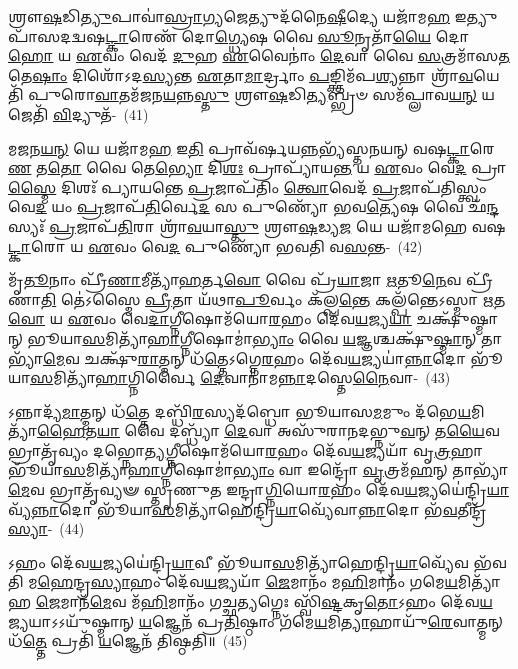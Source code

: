 𑌶𑍍𑌰𑍗\-\ul{𑌷}\-𑌡𑌿\-\ul{𑌤𑍍𑌯𑍁}\-𑌪𑌾𑌵𑌾॑\-\ul{𑌸𑍍𑌰𑌾}\-𑌗𑍍𑌯𑌜𑍇𑌤𑍍𑌯𑍁𑌦᳴𑌨𑍈\-\ul{𑌷𑍀}\-𑌦𑍍𑌯𑍇 𑌯𑌜𑌾᳴𑌮\-\ul{𑌹} 𑌇𑌤𑍍𑌯𑍁𑌪𑌾᳴𑌸\-𑌦𑌦𑍍𑌵𑌷\-\ul{𑌟𑍍𑌕𑌾}\-𑌰𑍇𑌣᳴ 𑌦𑍋\-\ul{𑌗𑍍𑌧𑍍𑌯𑍇}\-𑌷 𑌵𑍈 \ul{𑌸𑍂}\-𑌨𑍃𑌤𑌾᳴\-\ul{𑌯𑍈} 𑌦𑍋\-\ul{𑌹𑍋} 𑌯 \ul{𑌏}\-𑌵𑌂 𑌵𑍇𑌦᳴ \ul{𑌦𑍁}\-𑌹 \ul{𑌏}\-𑌵𑍈𑌨𑌾𑌂॑ \ul{𑌦𑍇}\-𑌵𑌾 𑌵𑍈 \ul{𑌸}\-𑌤𑍍𑌰𑌮𑌾᳴𑌸\-\ul{𑌤} 𑌤𑍇\-\ul{𑌷𑌾𑌂} 𑌦𑌿𑌶𑍋᳴\-𑌽𑌦\-\ul{𑌸𑍍𑌯}\-𑌨𑍍𑌤 \ul{𑌏}\-𑌤𑌾\-\ul{𑌮𑌾}\-𑌰𑍍𑌦𑍍𑌰𑌾𑌂 \ul{𑌪}\-𑌙𑍍𑌕𑍍𑌤𑌿𑌮᳴𑌪\-\ul{𑌶𑍍𑌯}\-𑌨𑍍𑌨𑌾 𑌶𑍍𑌰𑌾᳴\-\ul{𑌵}\-𑌯𑍇𑌤𑌿᳴ 𑌪𑍁𑌰𑍋\-\ul{𑌵𑌾}\-𑌤𑌮᳴𑌜𑌨\-\ul{𑌯}\-𑌨𑍍𑌨\-\ul{𑌸𑍍𑌤𑍁} 𑌶𑍍𑌰𑍗\-\ul{𑌷}\-𑌡𑌿\-\ul{𑌤𑍍𑌯}\-𑌬𑍍𑌭𑍍𑌰𑍞 𑌸𑌮᳴𑌪𑍍𑌲𑌾𑌵\-\ul{𑌯}\-\-\ul{𑌨𑍍} 𑌯𑌜𑍇𑌤𑌿᳴ \ul{𑌵𑌿}\-𑌦𑍍𑌯𑍁𑌤᳴-~(41)

𑌮𑌜𑌨\-\ul{𑌯}\-\-\ul{𑌨𑍍} 𑌯𑍇 𑌯𑌜𑌾᳴𑌮\-\ul{𑌹} 𑌇\-\ul{𑌤𑌿} 𑌪𑍍𑌰𑌾𑌵᳴𑌰𑍍\mbox{}𑌷𑌯\-\ul{𑌨𑍍𑌨}\-𑌭𑍍𑌯᳴𑌸𑍍𑌤𑌨𑌯𑌨𑍍 𑌵𑌷\-\ul{𑌟𑍍𑌕𑌾}\-𑌰𑍇\-\ul{𑌣} 𑌤\-\ul{𑌤𑍋} 𑌵𑍈 𑌤𑍇\-\ul{𑌭𑍍𑌯𑍋} 𑌦𑌿\-\ul{𑌶𑌃} 𑌪𑍍𑌰𑌾𑌪𑍍𑌯𑌾᳴𑌯\-\ul{𑌨𑍍𑌤} 𑌯 \ul{𑌏}\-𑌵𑌂 𑌵𑍇\-\ul{𑌦} 𑌪𑍍𑌰𑌾\-\ul{𑌸𑍍𑌮𑍈} 𑌦𑌿𑌶𑌃᳴ 𑌪𑍍𑌯𑌾𑌯𑌨𑍍𑌤𑍇 \ul{𑌪𑍍𑌰}\-𑌜𑌾𑌪᳴𑌤𑌿𑌂 \ul{𑌤𑍍𑌵𑍋}\-𑌵𑍇𑌦᳴ \ul{𑌪𑍍𑌰}\-𑌜𑌾𑌪᳴𑌤𑌿𑌸𑍍𑌤𑍍𑌵𑌂 𑌵𑍇\-\ul{𑌦} 𑌯𑌂 \ul{𑌪𑍍𑌰}\-𑌜𑌾𑌪᳴\-\ul{𑌤𑌿}\-𑌰𑍍𑌵𑍇\-\ul{𑌦} 𑌸 𑌪𑍁𑌣𑍍𑌯𑍋᳴ 𑌭𑌵\-\ul{𑌤𑍍𑌯𑍇}\-𑌷 𑌵𑍈 𑌛᳴\-\ul{𑌨𑍍𑌦}\-𑌸𑍍𑌯𑌃᳴ \ul{𑌪𑍍𑌰}\-𑌜𑌾𑌪᳴\-\ul{𑌤𑌿}\-𑌰𑌾 𑌶𑍍𑌰𑌾᳴\-\ul{𑌵}\-𑌯𑌾\-\ul{𑌸𑍍𑌤𑍁} 𑌶𑍍𑌰𑍗\-\ul{𑌷}\-𑌡𑍍𑌯\-\ul{𑌜} 𑌯𑍇 𑌯𑌜𑌾᳴𑌮𑌹𑍇 𑌵𑌷\-\ul{𑌟𑍍𑌕𑌾}\-𑌰𑍋 𑌯 \ul{𑌏}\-𑌵𑌂 𑌵𑍇\-\ul{𑌦} 𑌪𑍁𑌣𑍍𑌯𑍋᳴ 𑌭𑌵𑌤𑌿 𑌵\-\ul{𑌸}\-𑌨𑍍𑌤-~(42)

𑌮𑍃᳴\-\ul{𑌤𑍂}\-𑌨𑌾𑌂 𑌪𑍍𑌰𑍀᳴\-\ul{𑌣𑌾}\-𑌮𑍀𑌤𑍍𑌯𑌾᳴\-\ul{𑌹}\-𑌰𑍍𑌤\-\ul{𑌵𑍋} 𑌵𑍈 𑌪𑍍𑌰᳴\-\ul{𑌯𑌾}\-𑌜𑌾 \ul{𑌋}\-𑌤𑍂\-\ul{𑌨𑍇}\-𑌵 𑌪𑍍𑌰𑍀᳴𑌣𑌾\-\ul{𑌤𑌿} 𑌤𑍇॑\-𑌽𑌸𑍍𑌮𑍈 \ul{𑌪𑍍𑌰𑍀}\-𑌤𑌾 𑌯᳴𑌥𑌾\-\ul{𑌪𑍂}\-𑌰𑍍𑌵𑌂 𑌕᳴𑌲𑍍𑌪\-\ul{𑌨𑍍𑌤𑍇} 𑌕𑌲𑍍𑌪᳴𑌨𑍍𑌤𑍇\-𑌽𑌸𑍍𑌮𑌾 \ul{𑌋}\-𑌤\-\ul{𑌵𑍋} 𑌯 \ul{𑌏}\-𑌵𑌂 𑌵𑍇\-\ul{𑌦𑌾}\-𑌗𑍍𑌨𑍀𑌷𑍋𑌮᳴𑌯𑍋\-\ul{𑌰}\-𑌹𑌂 𑌦𑍇᳴𑌵\-\ul{𑌯}\-𑌜𑍍𑌯\-\ul{𑌯𑌾} 𑌚𑌕𑍍𑌷𑍁᳴𑌷𑍍𑌮𑌾𑌨𑍍 𑌭𑍂𑌯𑌾\-\ul{𑌸}\-𑌮𑌿𑌤𑍍𑌯𑌾᳴\-\ul{𑌹𑌾}\-𑌗𑍍𑌨𑍀𑌷𑍋𑌮𑌾॑\-\ul{𑌭𑍍𑌯𑌾𑌂} 𑌵𑍈 \ul{𑌯}\-𑌜𑍍𑌞𑌶𑍍𑌚𑌕𑍍𑌷𑍁᳴\-\ul{𑌷𑍍𑌮𑌾}\-𑌨𑍍 𑌤𑌾𑌭𑍍𑌯𑌾᳴\-\ul{𑌮𑍇}\-𑌵 𑌚𑌕𑍍𑌷𑍁᳴\-\ul{𑌰𑌾}\-𑌤𑍍𑌮𑌨𑍍 𑌧᳴\-\ul{𑌤𑍍𑌤𑍇}\-\-𑌽𑌗𑍍𑌨𑍇\-\ul{𑌰}\-𑌹𑌂 𑌦𑍇᳴𑌵\-\ul{𑌯}\-𑌜𑍍𑌯𑌯𑌾॑\-\ul{𑌨𑍍𑌨𑌾}\-𑌦𑍋 𑌭𑍂᳴𑌯𑌾\-\ul{𑌸}\-𑌮𑌿𑌤𑍍𑌯𑌾᳴\-\ul{𑌹𑌾}\-𑌗𑍍𑌨𑌿𑌰𑍍𑌵𑍈 \ul{𑌦𑍇}\-𑌵𑌾𑌨𑌾᳴𑌮\-\ul{𑌨𑍍𑌨𑌾}\-𑌦𑌸𑍍𑌤𑍇\-\ul{𑌨𑍈}\-𑌵𑌾-~(43)

𑌽𑌨𑍍𑌨𑌾𑌦𑍍𑌯᳴\-\ul{𑌮𑌾}\-𑌤𑍍𑌮𑌨𑍍 𑌧᳴\-\ul{𑌤𑍍𑌤𑍇} 𑌦𑌬𑍍𑌧𑌿᳴\-\ul{𑌰}\-𑌸𑍍𑌯𑌦᳴𑌬𑍍𑌧𑍋 𑌭𑍂𑌯𑌾𑌸\-\ul{𑌮}\-𑌮𑍁𑌂 𑌦᳴𑌭𑍇\-\ul{𑌯}\-𑌮𑌿𑌤𑍍𑌯𑌾᳴\-\ul{𑌹𑍈}\-𑌤\-\ul{𑌯𑌾} 𑌵𑍈 𑌦𑌬𑍍𑌧𑍍𑌯𑌾᳴ \ul{𑌦𑍇}\-𑌵𑌾 𑌅𑌸𑍁᳴𑌰𑌾𑌨𑌦𑌭𑍍𑌨𑍁\-\ul{𑌵}\-𑌨𑍍 𑌤\-\ul{𑌯𑍈}\-𑌵 𑌭𑍍𑌰𑌾𑌤𑍃᳴𑌵𑍍𑌯𑌂 𑌦𑌭𑍍𑌨𑍋\-\ul{𑌤𑍍𑌯}\-𑌗𑍍𑌨𑍀𑌷𑍋𑌮᳴𑌯𑍋\-\ul{𑌰}\-𑌹𑌂 𑌦𑍇᳴𑌵\-\ul{𑌯}\-𑌜𑍍𑌯𑌯𑌾᳴ 𑌵𑍃\-\ul{𑌤𑍍𑌰}\-𑌹𑌾 𑌭𑍂᳴𑌯𑌾\-\ul{𑌸}\-𑌮𑌿𑌤𑍍𑌯𑌾᳴\-\ul{𑌹𑌾}\-𑌗𑍍𑌨𑍀𑌷𑍋𑌮𑌾॑\-\ul{𑌭𑍍𑌯𑌾𑌂} 𑌵𑌾 𑌇𑌨𑍍𑌦𑍍𑌰𑍋᳴ \ul{𑌵𑍃}\-𑌤𑍍𑌰𑌮᳴\-\ul{𑌹}\-𑌨𑍍 𑌤𑌾𑌭𑍍𑌯𑌾᳴\-\ul{𑌮𑍇}\-𑌵 𑌭𑍍𑌰𑌾𑌤𑍃᳴𑌵𑍍𑌯𑍟 𑌸𑍍𑌤𑍃𑌣𑍁𑌤 𑌇𑌨𑍍𑌦𑍍𑌰𑌾\-\ul{𑌗𑍍𑌨𑌿}\-𑌯𑍋\-\ul{𑌰}\-𑌹𑌂 𑌦𑍇᳴𑌵\-\ul{𑌯}\-𑌜𑍍𑌯𑌯𑍇॑𑌨𑍍𑌦𑍍𑌰𑌿\-\ul{𑌯𑌾}\-𑌵𑍍𑌯᳴\-\ul{𑌨𑍍𑌨𑌾}\-𑌦𑍋 𑌭𑍂᳴𑌯𑌾\-\ul{𑌸}\-𑌮𑌿𑌤𑍍𑌯𑌾᳴𑌹𑍇𑌨𑍍𑌦𑍍𑌰𑌿\-\ul{𑌯𑌾}\-𑌵𑍍𑌯𑍇᳴𑌵𑌾\-\ul{𑌨𑍍𑌨𑌾}\-𑌦𑍋 𑌭᳴\-\ul{𑌵}\-𑌤𑍀𑌨𑍍𑌦𑍍𑌰᳴\-\ul{𑌸𑍍𑌯𑌾}\--~(44)

𑌽𑌹𑌂 𑌦𑍇᳴𑌵\-\ul{𑌯}\-𑌜𑍍𑌯𑌯𑍇॑𑌨𑍍𑌦𑍍𑌰𑌿\-\ul{𑌯𑌾}\-𑌵𑍀 𑌭𑍂᳴𑌯𑌾\-\ul{𑌸}\-𑌮𑌿𑌤𑍍𑌯𑌾᳴𑌹𑍇𑌨𑍍𑌦𑍍𑌰𑌿\-\ul{𑌯𑌾}\-𑌵𑍍𑌯𑍇᳴𑌵 𑌭᳴𑌵𑌤𑌿 𑌮\-\ul{𑌹𑍇}\-𑌨𑍍𑌦𑍍𑌰\-\ul{𑌸𑍍𑌯𑌾}\-𑌹𑌂 𑌦𑍇᳴𑌵\-\ul{𑌯}\-𑌜𑍍𑌯𑌯𑌾᳴ \ul{𑌜𑍇}\-𑌮𑌾𑌨𑌂᳴ 𑌮\-\ul{𑌹𑌿}\-𑌮𑌾𑌨𑌂᳴ 𑌗𑌮𑍇\-\ul{𑌯}\-𑌮𑌿𑌤𑍍𑌯𑌾᳴𑌹 \ul{𑌜𑍇}\-𑌮𑌾𑌨᳴\-\ul{𑌮𑍇}\-𑌵 𑌮᳴\-\ul{𑌹𑌿}\-𑌮𑌾𑌨𑌂᳴ 𑌗𑌚𑍍𑌛\-\ul{𑌤𑍍𑌯}\-𑌗𑍍𑌨𑍇𑌃 𑌸𑍍𑌵𑌿᳴\-\ul{𑌷𑍍𑌟}\-𑌕𑍃\-\ul{𑌤𑍋}\-\-𑌽𑌹𑌂 𑌦𑍇᳴𑌵\-\ul{𑌯}\-𑌜𑍍𑌯𑌯𑌾\-𑌽\-𑌽𑌯𑍁᳴𑌷𑍍𑌮𑌾𑌨𑍍 \ul{𑌯}\-𑌜𑍍𑌞𑍇𑌨᳴ 𑌪𑍍𑌰\-\ul{𑌤𑌿}\-𑌷𑍍𑌠𑌾𑌂 𑌗᳴𑌮𑍇\-\ul{𑌯}\-𑌮𑌿\-\ul{𑌤𑍍𑌯𑌾}\-𑌹𑌾𑌯𑍁᳴\-\ul{𑌰𑍇}\-𑌵𑌾𑌤𑍍𑌮𑌨𑍍 𑌧᳴\-\ul{𑌤𑍍𑌤𑍇} 𑌪𑍍𑌰𑌤𑌿᳴ \ul{𑌯}\-𑌜𑍍𑌞𑍇𑌨᳴ 𑌤𑌿𑌷𑍍𑌠𑌤𑌿॥~(45)

